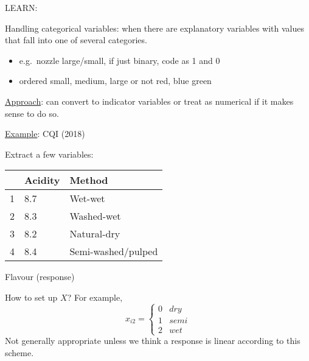 LEARN\@: 

Handling categorical variables: when there are explanatory
variables with values that fall into one of
several categories.
\begin{itemize}
    \item e.g.\ nozzle large/small, if just binary,
          code as 1 and 0
    \item ordered small, medium, large or not
          red, blue green
\end{itemize}
\underline{Approach}: can convert to indicator variables
or treat as numerical if it makes sense to do so.

\underline{Example}: CQI (2018)

Extract a few variables:
\begin{table}[H]
    \centering
    \begin{tabularx}{0.7\linewidth}{@{}YYY@{}}
          & Acidity & Method             \\
         & 8.7     & Wet-wet            \\
        2 & 8.3     & Washed-wet         \\
        3 & 8.2     & Natural-dry        \\
        4 & 8.4     & Semi-washed/pulped
    \end{tabularx}
\end{table}
Flavour (response)

How to set up $ X $? For example,
\[ x_{i2}=\begin{cases*}
        0 & dry\\
        1 & semi\\
        2 & wet
    \end{cases*} \]
Not generally appropriate unless we think
a response is linear according to this scheme.

